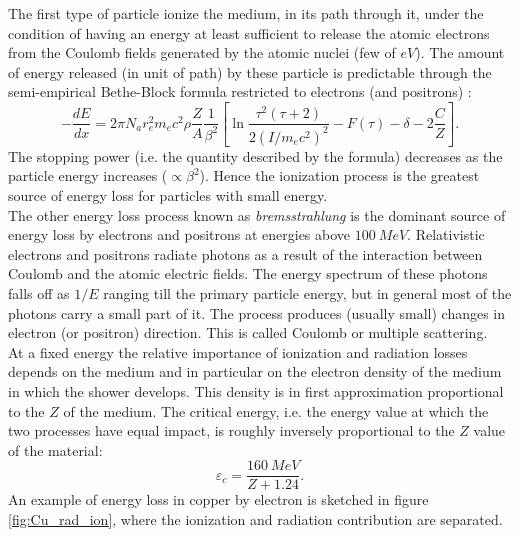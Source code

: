 The first type of particle ionize the medium, in its path through it, under the condition of having an energy at least sufficient to release the atomic electrons from the Coulomb fields generated by the atomic nuclei (few of $eV$).
The amount of energy released (in unit of path) by these particle is predictable through the semi-empirical Bethe-Block formula restricted to electrons (and positrons) \cite{Leo}:
\begin{equation}
    -\frac{dE}{dx} = 2\pi N_a r_e^2 m_e c^2 \rho \frac{Z}{A}\frac{1}{\beta^2}\left[ \ln{\frac{\tau^2(\tau + 2)}{2(I/m_ec^2)^2}} -F(\tau) -\delta -2\frac{C}{Z}\right].
\end{equation}
The stopping power (i.e. the quantity described by the formula) decreases as the particle energy increases ($\propto \beta^2$). Hence the ionization process is the greatest source of energy loss for particles with small energy.\\
The other energy loss process known as \textit{bremsstrahlung} is the dominant source of energy loss by electrons and positrons at energies above $100\ MeV$. Relativistic electrons and positrons radiate photons as a result of the interaction between Coulomb and the atomic electric fields. The energy spectrum of these photons falls off as $1/E$ ranging till the primary particle energy, but in general most of the photons carry a small part of it.
The process produces (usually small) changes in electron (or positron) direction. This is called Coulomb or multiple scattering.\\
At a fixed energy the relative importance of ionization and radiation losses depends on the medium and in particular on the electron density of the medium in which the shower develops. This density is in first approximation proportional to the $Z$ of the medium.
The critical energy, i.e. the energy value at which the two processes have equal impact, is roughly inversely proportional to the $Z$ value of the material:
\begin{equation}
    \varepsilon_c = \frac{160\ MeV}{Z + 1.24}.
\end{equation}
An example of energy loss in copper by electron is sketched in figure \ref{fig:Cu_rad_ion}, where the ionization and radiation contribution are separated.\\

